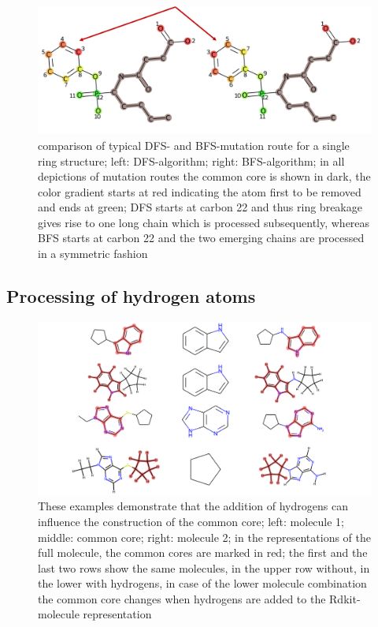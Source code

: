 \begin{figure}
\includegraphics[scale=1.4]{simple_ring_exampledfs.png}

\caption{comparison of typical DFS- and BFS-mutation route for a single ring structure; left: DFS-algorithm; right: BFS-algorithm; in all depictions of mutation routes the common core is shown in dark, the color gradient starts at red indicating the atom first to be removed and ends at green; DFS
starts at carbon 22 and thus ring breakage gives rise to one long
chain which is processed subsequently, whereas BFS starts at carbon
22 and the two emerging chains are processed in a symmetric fashion 
}

\end{figure}


\subsection{Processing of hydrogen atoms}

\begin{figure}
	
	\includegraphics[scale=0.35]{hydrogens_plus_minus}
	\caption{These examples demonstrate that the addition of hydrogens can influence the construction of the common core; left: molecule 1; middle: common core; right: molecule 2; in the representations of the full molecule, the common cores are marked in red; the first
		and the last two rows show the same molecules, in the upper row without,
		in the lower with hydrogens, in case of the lower molecule combination
		the common core changes when hydrogens are added to the Rdkit-molecule
		representation }
		\label{fig:hydrogen_effect}
	\end{figure}


